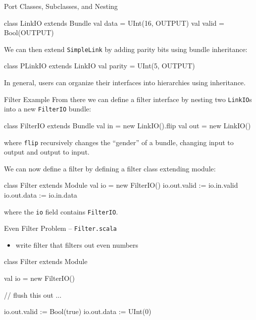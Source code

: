 \documentclass[xcolor=pdflatex,dvipsnames,table]{beamer}
\begin{document}
\begin{frame}[fragile]{Port Classes, Subclasses, and Nesting}

\begin{scala}
class LinkIO extends Bundle { 
  val data  = UInt(16, OUTPUT) 
  val valid = Bool(OUTPUT)
}
\end{scala}

\noindent
We can then extend \verb+SimpleLink+ by adding parity bits using
bundle inheritance:

\begin{scala}
class PLinkIO extends LinkIO { 
  val parity = UInt(5, OUTPUT) 
}
\end{scala}

\noindent
In general, users can organize their interfaces into hierarchies using inheritance.  

\end{frame}

\begin{frame}[fragile]{Filter Example}
From there we can define a filter interface by nesting two
\verb+LinkIO+s into a new \verb+FilterIO+ bundle:

\begin{scala}
class FilterIO extends Bundle { 
  val in  = new LinkIO().flip
  val out = new LinkIO()
}
\end{scala}

\noindent
where \verb+flip+ recursively changes the ``gender'' of a bundle,
changing input to output and output to input.

We can now define a filter by defining a filter class extending module:

\begin{scala}
class Filter extends Module { 
  val io  = new FilterIO()
  io.out.valid := io.in.valid
  io.out.data  := io.in.data
}
\end{scala}

\noindent 
where the \verb+io+ field contains \verb+FilterIO+. 

\end{frame}

\begin{frame}[fragile]{Even Filter Problem -- \tt Filter.scala}
\begin{itemize}
\item write filter that filters out even numbers
\end{itemize}
\begin{scala}
class Filter extends Module { 
  val io  = new FilterIO()

  // flush this out ...

  io.out.valid := Bool(true)
  io.out.data  := UInt(0)
}
\end{scala}
\end{frame}
\end{document}
